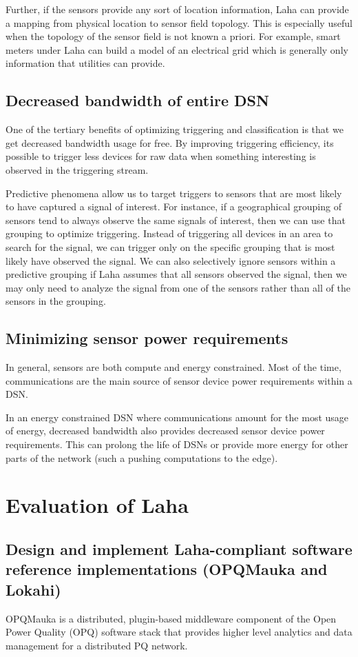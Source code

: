 Further, if the sensors provide any sort of location information, Laha can provide a mapping from physical location to sensor field topology. This is especially useful when the topology of the sensor field is not known a priori. For example, smart meters under Laha can build a model of an electrical grid which is generally only information that utilities can provide.


\subsection{Decreased bandwidth of entire DSN}
One of the tertiary benefits of optimizing triggering and classification is that we get decreased bandwidth usage for free. By improving triggering efficiency, its possible to trigger less devices for raw data when something interesting is observed in the triggering stream.

Predictive phenomena allow us to target triggers to sensors that are most likely to have captured a signal of interest. For instance, if a geographical grouping of sensors tend to always observe the same signals of interest, then we can use that grouping to optimize triggering. Instead of triggering all devices in an area to search for the signal, we can trigger only on the specific grouping that is most likely have observed the signal. We can also selectively ignore sensors within a predictive grouping if Laha assumes that all sensors observed the signal, then we may only need to analyze the signal from one of the sensors rather than all of the sensors in the grouping.

\subsection{Minimizing sensor power requirements}
In general, sensors are both compute and energy constrained. Most of the time, communications are the main source of sensor device power requirements within a DSN.

In an energy constrained DSN where communications amount for the most usage of energy, decreased bandwidth also provides decreased sensor device power requirements. This can prolong the life of DSNs or provide more energy for other parts of the network (such a pushing computations to the edge).

\section{Evaluation of Laha}
\subsection{Design and implement Laha-compliant software reference implementations (OPQMauka and Lokahi)}
OPQMauka is a distributed, plugin-based middleware component of the Open Power Quality (OPQ) software stack that provides higher level analytics and data management for a distributed PQ network.

